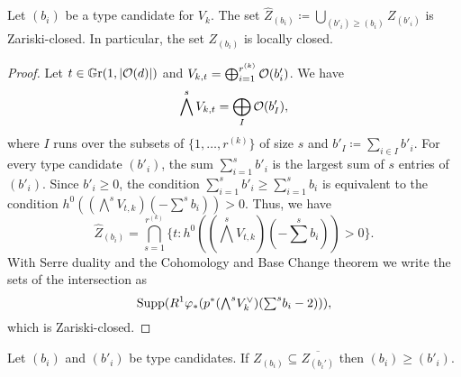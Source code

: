\begin{proposition}
	Let $(b_i)$ be a type candidate for $V_k$. The set $\widehat Z_{(b_i)} \coloneqq \bigcup_{(b'_i)\geq(b_i)} Z_{(b'_i)}$ is Zariski-closed. In particular, the set $Z_{(b_i)}$ is locally closed.
\end{proposition}

\begin{proof}
Let $t\in \mathbb G \mathrm r(1,\lvert\mathcal{O}(d)\rvert)$ and $V_{k,t} = \bigoplus_{i=1}^{r^{(k)}} \mathcal{O}(b'_i)$. We have
\[
\bigwedge^s V_{k,t} = \bigoplus_{I} \mathcal{O}(b_I'),
\]
where $I$ runs over the subsets of $\{1,\dotsc, r^{(k)}\}$ of size $s$ and $b'_I\coloneqq \sum_{i\in I} b'_i$.
For every type candidate $(b'_i)$, the sum $\sum_{i=1}^s b'_i$ is the largest sum of $s$ entries of $(b'_i)$. Since $b'_i \geq 0$, the condition $\sum_{i=1}^s b'_i \geq \sum_{i=1}^s b_i$ is equivalent to the condition $h^0((\textstyle{\bigwedge}^{s} V_{t,k})(-\textstyle{\sum}^s b_i)) > 0$. Thus, we have
\[
	\widehat Z_{(b_i)} = \bigcap_{s=1}^{r^{(k)}} \{t : h^0((\textstyle{\bigwedge}^{s} V_{t,k})(-\textstyle{\sum}^s b_i)) > 0\}.
\]
With Serre duality and the Cohomology and Base Change theorem we write the sets of the intersection as 
\[
	\operatorname{Supp}(R^1 \varphi_{*} (p^{*} (\textstyle{\bigwedge}^{s} V_k^\vee )(\textstyle{\sum}^s b_i - 2))),
\]
which is Zariski-closed.
\end{proof}

\begin{corollary}
	Let $(b_i)$ and $(b'_i)$ be type candidates. If $Z_{(b_i)} \subseteq \overline{Z_{(b_i')}}$ then $(b_i) \geq (b'_i)$.
\end{corollary}